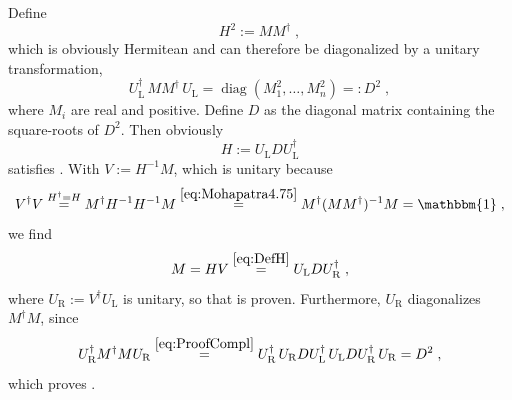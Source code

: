 \documentclass[12pt,a4paper,twoside]{scrartcl}
\DeclareMathOperator{\diag}{diag}
\numberwithin{equation}{section}
\numberwithin{table}{section}
\begin{document}
\begin{Proof}
 Define
 \begin{equation}\label{eq:Mohapatra4.75}
        H^2 := M M^\dagger \;,
 \end{equation}
 which is obviously Hermitean and can therefore be diagonalized by a
 unitary transformation,
 \begin{equation}
        U_\mathrm{L}^\dagger \, M M^\dagger \, U_\mathrm{L} =
         \diag(M_1^2,\dots,M_n^2) =: D^2 \;,
 \end{equation}
 where $M_i$ are real and positive.
 Define $D$ as the diagonal matrix containing the square-roots of $D^2$.
 Then obviously
 \begin{equation} \label{eq:DefH}
        H := U_\mathrm{L} D U_\mathrm{L}^\dagger 
 \end{equation}
 satisfies . With $V:=H^{-1}M$, 
 which is unitary because
 \begin{equation}
        V^\dagger V \stackrel{H^\dagger=H}{=}
        M^\dagger H^{-1} H^{-1} M \stackrel{\eqref{eq:Mohapatra4.75}}{=}
        M^\dagger (M M^\dagger)^{-1} M = \mathbbm{1} \;,
 \end{equation}
 we find
 \begin{equation} \label{eq:ProofCompl}
        M = H V \stackrel{\eqref{eq:DefH}}{=}
        U_\mathrm{L} D U_\mathrm{R}^\dagger \;,
 \end{equation}
 where $U_\mathrm{R} := V^\dagger U_\mathrm{L}$ is unitary, so that
  is proven. Furthermore, $U_\mathrm{R}$
 diagonalizes $M^\dagger M$, since
 \begin{equation}
        U_\mathrm{R}^\dagger M^\dagger M U_\mathrm{R}
        \stackrel{\eqref{eq:ProofCompl}}{=}
        U_\mathrm{R}^\dagger \, U_\mathrm{R} D U_\mathrm{L}^\dagger \,
         U_\mathrm{L} D U_\mathrm{R}^\dagger \, U_\mathrm{R} = D^2 \;,
 \end{equation}
 which proves .
\end{Proof}
\end{document}
